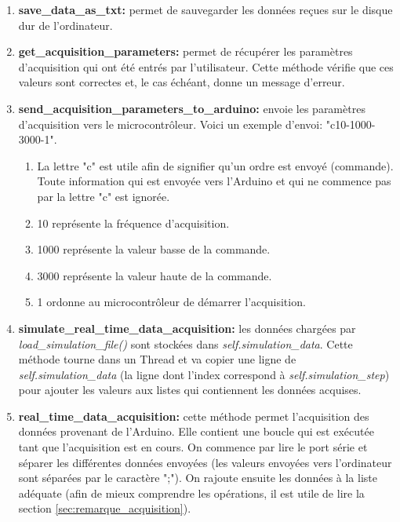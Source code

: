 \begin{enumerate}
    \item \textbf{save\_data\_as\_txt:} permet de sauvegarder les données reçues sur le disque dur de l'ordinateur.
    
    \item \textbf{get\_acquisition\_parameters:} permet de récupérer les paramètres d'acquisition qui ont été entrés par l'utilisateur. Cette méthode vérifie que ces valeurs sont correctes et, le cas échéant, donne un message d'erreur.
    
    \item \textbf{send\_acquisition\_parameters\_to\_arduino:} envoie les paramètres d'acquisition vers le microcontrôleur. Voici un exemple d'envoi: "c10-1000-3000-1".
    \begin{enumerate}
        \item La lettre "c" est utile afin de signifier qu'un ordre est envoyé (commande). Toute information qui est envoyée vers l'Arduino et qui ne commence pas par la lettre "c" est ignorée.
        
        \item 10 représente la fréquence d'acquisition.
        
        \item 1000 représente la valeur basse de la commande.
        
        \item 3000 représente la valeur haute de la commande.
        
        \item 1 ordonne au microcontrôleur de démarrer l'acquisition.
    \end{enumerate}
    
    \item \textbf{simulate\_real\_time\_data\_acquisition:} les données chargées par \textit{load\_simulation\_file()} sont stockées dans \textit{self.simulation\_data}. Cette méthode tourne dans un Thread et va copier une ligne de \textit{self.simulation\_data} (la ligne dont l'index correspond à \textit{self.simulation\_step}) pour ajouter les valeurs aux listes qui contiennent les données acquises.
    
    \item \textbf{real\_time\_data\_acquisition:} cette méthode permet l'acquisition des données provenant de l'Arduino. Elle contient une boucle qui est exécutée tant que l'acquisition est en cours. On commence par lire le port série et séparer les différentes données envoyées (les valeurs envoyées vers l'ordinateur sont séparées par le caractère ";"). On rajoute ensuite les données à la liste adéquate (afin de mieux comprendre les opérations, il est utile de lire la section \ref{sec:remarque_acquisition}).
    

\end{enumerate}
